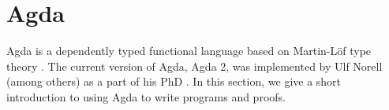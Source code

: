 \section{Agda}
\label{Agda}
Agda is a dependently typed functional language based on Martin-Löf type theory \cite{Martin-Löf}. The current version of Agda, Agda 2, was implemented by Ulf Norell (among others) as a part of his PhD \citep{NorellAgda}. 
In this section, we give a short introduction to using Agda to write programs and proofs.

